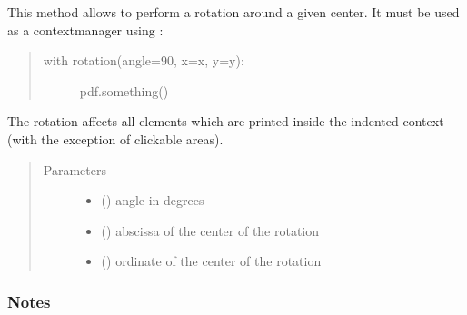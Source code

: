 \documentclass[letterpaper,10pt,english]{sphinxmanual}
\begin{document}
\begin{fulllineitems}
\begin{fulllineitems}
\label{\detokenize{generated/quality_assessment.quality_pdf_report.DefectReportPDF.rotation:quality_assessment.quality_pdf_report.DefectReportPDF.rotation}}
\sphinxAtStartPar
This method allows to perform a rotation around a given center.
It must be used as a context\sphinxhyphen{}manager using :
\begin{quote}
\begin{description}
\item[{with rotation(angle=90, x=x, y=y):}] \leavevmode
\sphinxAtStartPar
pdf.something()

\end{description}
\end{quote}

\sphinxAtStartPar
The rotation affects all elements which are printed inside the indented
context (with the exception of clickable areas).
\begin{quote}\begin{description}
\item[{Parameters}] \leavevmode\begin{itemize}
\item {} 
\sphinxAtStartPar
{} () \textendash{} angle in degrees

\item {} 
\sphinxAtStartPar
{} () \textendash{} abscissa of the center of the rotation

\item {} 
\sphinxAtStartPar
{} () \textendash{} ordinate of the center of the rotation

\end{itemize}

\end{description}\end{quote}
\subsubsection*{Notes}


\end{fulllineitems}
\end{fulllineitems}
\end{document}
